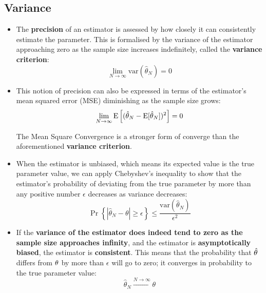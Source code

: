 \subsection{Variance}

\begin{itemize}
    \item The \textbf{precision} of an estimator is assessed by how closely it can consistently estimate the parameter. This is formalised by the variance of the estimator approaching zero as the sample size increases indefinitely, called the \textbf{variance criterion}:
    \begin{equation}
    \lim_{N \to \infty} \mathrm{var}(\hat{\theta}_N) = 0
    \end{equation}
    
    \item This notion of precision can also be expressed in terms of the estimator's mean squared error (MSE) diminishing as the sample size grows:
    \begin{equation}
    \lim_{N \to \infty} \text{E}\left[ (\hat{\theta}_N - \text{E}[\hat{\theta}_N])^2 \right] = 0
    \end{equation}

    The Mean Square Convergence is a stronger form of converge than the aforementioned \textbf{variance criterion}.
    
    \item When the estimator is unbiased, which means its expected value is the true parameter value, we can apply Chebyshev's inequality to show that the estimator's probability of deviating from the true parameter by more than any positive number \(\epsilon\) decreases as variance decreases:
    \begin{equation}
    \Pr\left\{|\hat{\theta}_N - \theta| \geq \epsilon\right\} \leq \frac{\mathrm{var}(\hat{\theta}_N)}{\epsilon^2}
    \end{equation}
    
    \item If the \textbf{variance of the estimator does indeed tend to zero as the sample size approaches infinity}, and the estimator is \textbf{asymptotically biased}, the estimator is \textbf{consistent}. This means that the probability that $\hat{\theta}$ differs from $\theta$ by more than $\epsilon$ will go to zero; it converges in probability to the true parameter value:
    \begin{equation}
    \hat{\theta}_N \xrightarrow{N \to \infty} \theta
    \end{equation}
\end{itemize}


